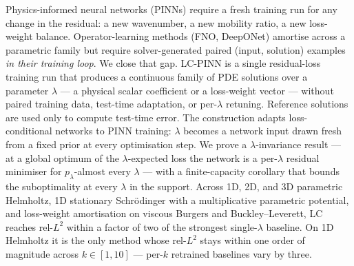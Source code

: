 Physics-informed neural networks (PINNs) require a fresh training
run for any change in the residual: a new wavenumber, a new
mobility ratio, a new loss-weight balance. Operator-learning
methods (FNO, DeepONet) amortise across a parametric family but
require solver-generated paired (input, solution) examples
\emph{in their training loop}. We close that gap. LC-PINN is a
single residual-loss training run that produces a continuous
family of PDE solutions over a parameter $\lambda$ --- a physical
scalar coefficient or a loss-weight vector --- without paired
training data, test-time adaptation, or per-$\lambda$ retuning.
Reference solutions are used only to compute test-time error. The construction adapts loss-conditional
networks \citep{dosovitskiy2020} to PINN training: $\lambda$
becomes a network input drawn fresh from a fixed prior at every
optimisation step. We prove a $\lambda$-invariance result --- at
a global optimum of the $\lambda$-expected loss the network is a
per-$\lambda$ residual minimiser for $p_\lambda$-almost every
$\lambda$ --- with a finite-capacity corollary that bounds the
suboptimality at every $\lambda$ in the support. Across 1D, 2D, and 3D parametric Helmholtz, 1D stationary Schrödinger
with a multiplicative parametric potential, and loss-weight
amortisation on viscous Burgers and Buckley--Leverett, LC reaches
rel-$L^2$ within a factor of two of the strongest single-$\lambda$
baseline. On 1D Helmholtz it is the only method whose rel-$L^2$
stays within one order of magnitude across $k\!\in\![1,10]$ ---
per-$k$ retrained baselines vary by three.
